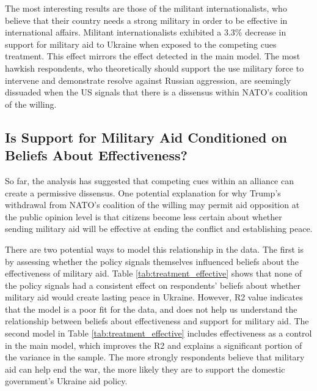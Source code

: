 \begin{appendices}
The most interesting results are those of the militant internationalists, who believe that their country needs a strong military in order to be effective in international affairs. Militant internationalists exhibited a 3.3\% decrease in support for military aid to Ukraine when exposed to the competing cues treatment. This effect mirrors the effect detected in the main model. The most hawkish respondents, who theoretically should support the use military force to intervene and demonstrate resolve against Russian aggression, are seemingly dissuaded when the US signals that there is a dissensus within NATO's coalition of the willing.


\subsection{Is Support for Military Aid Conditioned on Beliefs About Effectiveness?}
So far, the analysis has suggested that competing cues within an alliance can create a permissive dissensus. One potential explanation for why Trump's withdrawal from NATO's coalition of the willing may permit aid opposition at the public opinion level is that citizens become less certain about whether sending military aid will be effective at ending the conflict and establishing peace.  

There are two potential ways to model this relationship in the data. The first is by assessing whether the policy signals themselves influenced beliefs about the effectiveness of military aid. Table \ref{tab:treatment_effective} shows that none of the policy signals had a consistent effect on respondents' beliefs about whether military aid would create lasting peace in Ukraine. However, R2 value indicates that the model is a poor fit for the data, and does not help us understand the relationship between beliefs about effectiveness and support for military aid. The second model in Table \ref{tab:treatment_effective} includes effectiveness as a control in the main model, which improves the R2 and explains a significant portion of the variance in the sample. The more strongly respondents believe that military aid can help end the war, the more likely they are to support the domestic government's Ukraine aid policy. 


\end{appendices}
